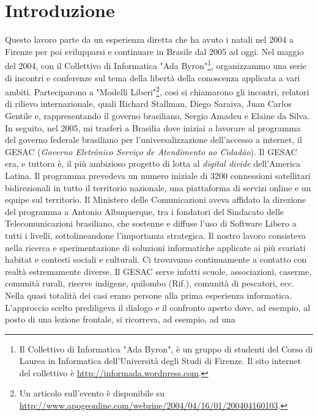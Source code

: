 
\chapter{Introduzione}
\label{Capitolo1}

Questo lavoro parte da un esperienza diretta che ha avuto i natali nel
2004 a Firenze per poi svilupparsi e continuare in Brasile dal 2005 ad
oggi. Nel maggio del 2004, con il Collettivo di Informatica "Ada
Byron"\footnote{Il Collettivo di Informatica "Ada Byron", è un gruppo
  di studenti del Corso di Laurea in Informatica dell’Università degli
  Studi di Firenze. Il sito internet del collettivo è
  \url{http://informada.wordpress.com}.}, organizzammo una serie di
incontri e conferenze sul tema della libertà della conoscenza
applicata a vari ambiti. Parteciparono a "Modelli Liberi"\footnote{Un
  articolo sull'evento è disponibile su
  \url{http://www.apogeonline.com/webzine/2004/04/16/01/200404160103}.},
cosi si chiamarono gli incontri, relatori di rilievo internazionale,
quali Richard Stallman, Diego Saraiva, Juan Carlos Gentile e,
rappresentando il governo brasiliano, Sergio Amadeu e Elaine da
Silva. In seguito, nel 2005, mi trasferì a Brasilia dove iniziai a
lavorare al programma del governo federale brasiliano per
l'universalizzazione dell'accesso a internet, il GESAC (\emph{Governo
  Eletrônico Serviço de Atendimento ao Cidadão}). Il GESAC era, e
tuttora è, il più ambizioso progetto di lotta al \emph{digital divide}
dell'America Latina. Il programma prevedeva un numero iniziale di 3200
connessioni satellitari bidirezionali in tutto il territorio
nazionale, una piattaforma di servizi online e un equipe sul
territorio. Il Ministero delle Comunicazioni aveva affidato la
direzione del programma a Antonio Albuquerque, tra i fondatori del
Sindacato delle Telecomunicazioni brasiliano, che sostenne e diffuse
l'uso di Software Libero a tutti i livelli, sottolineandone
l'importanza strategica. Il nostro lavoro consisteva nella ricerca e
sperimentazione di soluzioni informatiche applicate ai più svariati
habitat e contesti sociali e culturali. Ci trovavamo continuamente a
contatto con realtà estremamente diverse. Il GESAC serve infatti
scuole, associazioni, caserme, comunità rurali, riserve indigene,
quilombo (Rif.), comunità di pescatori, ecc. Nella quasi totalità dei
casi erano persone alla prima esperienza informatica. L'approccio
scelto prediligeva il dialogo e il confronto aperto dove, ad esempio,
al posto di una lezione frontale, si ricorreva, ad esempio, ad una
